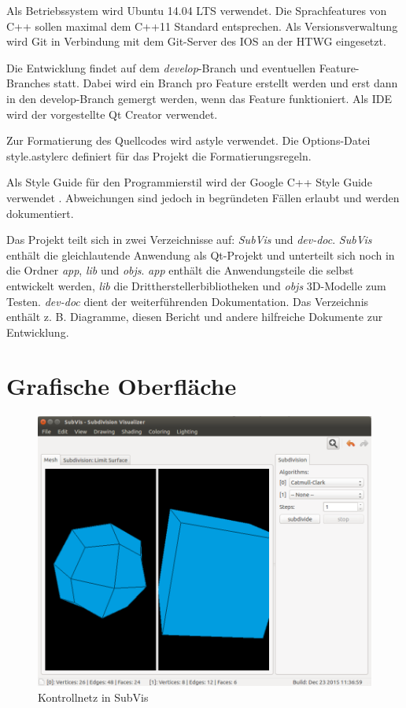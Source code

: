 Als Betriebssystem wird Ubuntu 14.04 LTS verwendet. 
Die Sprachfeatures von C++ sollen maximal dem C++11 Standard entsprechen.
Als Versionsverwaltung wird Git in Verbindung mit dem Git-Server des IOS an der HTWG eingesetzt. 

Die Entwicklung findet auf dem \emph{develop}-Branch und eventuellen Feature-Branches statt.
Dabei wird ein Branch pro Feature erstellt werden und erst dann in den develop-Branch gemergt werden, wenn das Feature funktioniert.
Als IDE wird der vorgestellte Qt Creator verwendet.

Zur Formatierung des Quellcodes wird astyle verwendet. 
Die Options-Datei style.astylerc definiert für das Projekt die Formatierungsregeln. 

Als Style Guide für den Programmierstil wird der Google C++ Style Guide verwendet \cite{GsgC++}.
Abweichungen sind jedoch in begründeten Fällen erlaubt und werden dokumentiert.

Das Projekt teilt sich in zwei Verzeichnisse auf: \emph{SubVis} und \emph{dev-doc}.
\emph{SubVis} enthält die gleichlautende Anwendung als Qt-Projekt und unterteilt sich noch in die Ordner \emph{app}, \emph{lib} und \emph{objs}.
\emph{app} enthält die Anwendungsteile die selbst entwickelt werden,
\emph{lib} die Drittherstellerbibliotheken und \emph{objs} 3D-Modelle zum Testen.
\emph{dev-doc} dient der weiterführenden Dokumentation.
Das Verzeichnis enthält z. B. Diagramme, diesen Bericht und andere hilfreiche Dokumente zur Entwicklung.

\section{Grafische Oberfläche} \label{sec:gui}

\begin{figure}
  \centering
  \includegraphics[width=\textwidth]{content/media/subvis_mesh.png}
  \caption{Kontrollnetz in SubVis}
  \label{fig:subvis_mesh}
\end{figure}

